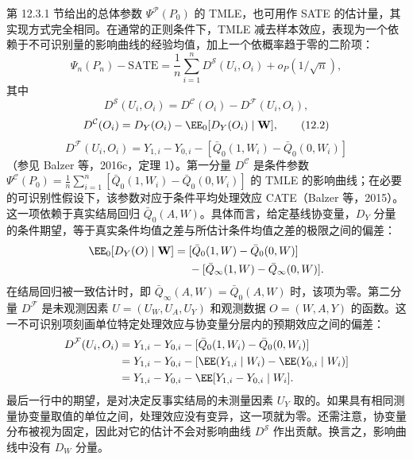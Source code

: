 第 12.3.1 节给出的总体参数 $\Psi^{\mathcal P}(P_0)$ 的 TMLE，也可用作 SATE 的估计量，其实现方式完全相同。在通常的正则条件下，TMLE 减去样本效应，表现为一个依赖于不可识别量的影响曲线的经验均值，加上一个依概率趋于零的二阶项：
\[
\Psi_n(P_n)-\mathrm{SATE}
=\frac1n\sum_{i=1}^nD^{\mathcal S}(U_i,O_i)+o_P(1/\sqrt n),
\]
其中
\[
D^{\mathcal S}(U_i,O_i)=D^{\mathcal C}(O_i)-D^{\mathcal F}(U_i,O_i),
\]
\begin{equation}
D^{\mathcal C}(O_i)=D_Y(O_i)-\EE_0[D_Y(O_i)\mid\mathbf W],
\tag{12.2}
\end{equation}
\begin{equation}
D^{\mathcal F}(U_i,O_i)=Y_{1,i}-Y_{0,i}-[\bar Q_0(1,W_i)-\bar Q_0(0,W_i)]
\tag{12.3}
\end{equation}
（参见 Balzer 等，2016c，定理 1）。第一分量 $D^{\mathcal C}$ 是条件参数 $\Psi^{\mathcal C}(P_0)=\frac1n\sum_{i=1}^n[\bar Q_0(1,W_i)-\bar Q_0(0,W_i)]$ 的 TMLE 的影响曲线；在必要的可识别性假设下，该参数对应于条件平均处理效应 CATE（Balzer 等，2015）。这一项依赖于真实结局回归 $\bar Q_0(A,W)$。具体而言，给定基线协变量，$D_Y$ 分量的条件期望，等于真实条件均值之差与所估计条件均值之差的极限之间的偏差：
\[
\begin{aligned}
\EE_0[D_Y(O)\mid\mathbf W]
={}&[\bar Q_0(1,W)-\bar Q_0(0,W)]\\
&-[\bar Q_\infty(1,W)-\bar Q_\infty(0,W)].
\end{aligned}
\]
在结局回归被一致估计时，即 $\bar Q_\infty(A,W)=\bar Q_0(A,W)$ 时，该项为零。第二分量 $D^{\mathcal F}$ 是未观测因素 $U=(U_W,U_A,U_Y)$ 和观测数据 $O=(W,A,Y)$ 的函数。这一不可识别项刻画单位特定处理效应与协变量分层内的预期效应之间的偏差：
\[
\begin{aligned}
D^{\mathcal F}(U_i,O_i)
&=Y_{1,i}-Y_{0,i}-[\bar Q_0(1,W_i)-\bar Q_0(0,W_i)]\\
&=Y_{1,i}-Y_{0,i}-[\EE(Y_{1,i}\mid W_i)-\EE(Y_{0,i}\mid W_i)]\\
&=Y_{1,i}-Y_{0,i}-\EE[Y_{1,i}-Y_{0,i}\mid W_i].
\end{aligned}
\]
最后一行中的期望，是对决定反事实结局的未测量因素 $U_Y$ 取的。如果具有相同测量协变量取值的单位之间，处理效应没有变异，这一项就为零。还需注意，协变量分布被视为固定，因此对它的估计不会对影响曲线 $D^{\mathcal S}$ 作出贡献。换言之，影响曲线中没有 $D_W$ 分量。

